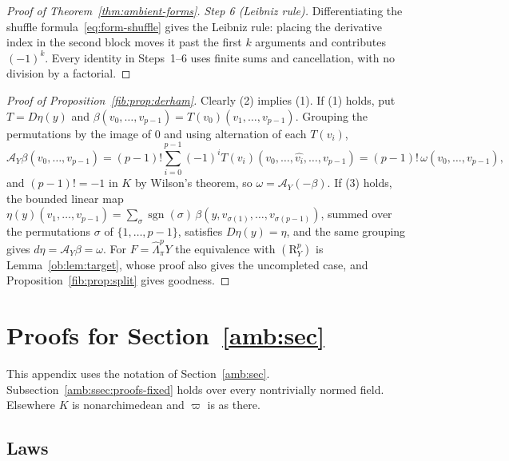 \documentclass[11pt]{amsart}
\theoremstyle{definition}
\theoremstyle{remark}
\numberwithin{equation}{section}
\newcommand{\sgn}{\operatorname{sgn}}
\theoremstyle{plain}
\theoremstyle{definition}
\theoremstyle{plain}
\begin{document}
\begin{proof}[Proof of Theorem~\ref{thm:ambient-forms}]
\emph{Step 6 (Leibniz rule).} Differentiating the shuffle formula~\eqref{eq:form-shuffle} gives the Leibniz rule: placing the derivative index in the second block moves it past the first $k$ arguments and contributes $(-1)^k$. Every identity in Steps~1--6 uses finite sums and cancellation, with no division by a factorial.
\end{proof}

\begin{proof}[Proof of Proposition~\ref{fib:prop:derham}]
Clearly (2) implies (1). If (1) holds, put $T=D\eta(y)$ and $\beta(v_0,\dots,v_{p-1})=T(v_0)(v_1,\dots,v_{p-1})$. Grouping the permutations by the image of $0$ and using alternation of each $T(v_i)$,
\[
 \mathcal A_Y\beta(v_0,\dots,v_{p-1})=(p-1)!\sum_{i=0}^{p-1}(-1)^iT(v_i)(v_0,\dots,\widehat{v_i},\dots,v_{p-1})
 =(p-1)!\,\omega(v_0,\dots,v_{p-1}),
\]
and $(p-1)!=-1$ in $K$ by Wilson's theorem, so $\omega=\mathcal A_Y(-\beta)$. If (3) holds, the bounded linear map $\eta(y)(v_1,\dots,v_{p-1})=\sum_\sigma\sgn(\sigma)\,\beta(y,v_{\sigma(1)},\dots,v_{\sigma(p-1)})$, summed over the permutations $\sigma$ of $\{1,\dots,p-1\}$, satisfies $D\eta(y)=\eta$, and the same grouping gives $d\eta=\mathcal A_Y\beta=\omega$. For $F=\widehat\Lambda^p_\pi Y$ the equivalence with $(\mathrm R^p_Y)$ is Lemma~\ref{ob:lem:target}, whose proof also gives the uncompleted case, and Proposition~\ref{fib:prop:split} gives goodness.
\end{proof}
\section{Proofs for Section~\ref{amb:sec}}\label{amb:app}

This appendix uses the notation of Section~\ref{amb:sec}. Subsection~\ref{amb:ssec:proofs-fixed} holds over every nontrivially normed field. Elsewhere $K$ is nonarchimedean and $\varpi$ is as there.

\subsection{Laws}\label{amb:ssec:laws}
\end{document}
